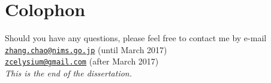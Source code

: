 \chapter*{Colophon}


\begin{center}


Should you have any questions, please feel free to contact me by e-mail
\\\href{mailto:zhang.chao@nims.go.jp}{\nolinkurl{zhang.chao@nims.go.jp}} (until March 2017)
\\\href{mailto:zcelysium@gmail.com}{\nolinkurl{zcelysium@gmail.com}} (after March 2017)
\\[10ex]\emph{This is the end of the dissertation. } 

\end{center}